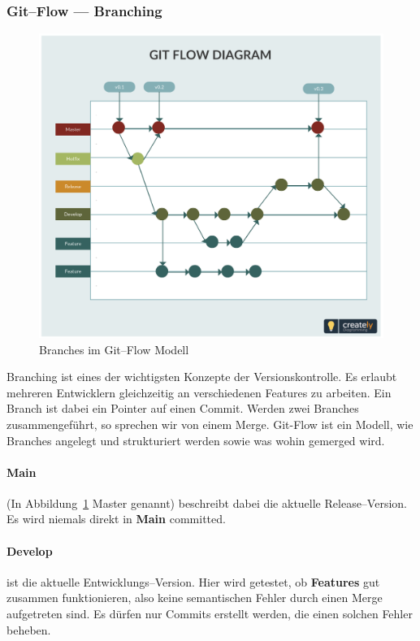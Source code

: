     \subsubsection{Git--Flow --- Branching}\label{subsubsec:git--flow-----branching}
        \begin{figure}
            \centering
            \includegraphics[width=\paperwidth-2in]{../assets/img/git_flow}
            \caption{Branches im Git--Flow Modell~\autocite{creately-no-date}}
            \label{fig:git-flow}
        \end{figure}
        Branching ist eines der wichtigsten Konzepte der Versionskontrolle.
        Es erlaubt mehreren Entwicklern gleichzeitig an verschiedenen Features zu arbeiten.
        Ein Branch ist dabei ein Pointer auf einen Commit.
        Werden zwei Branches zusammengeführt, so sprechen wir von einem Merge.
        Git-Flow ist ein Modell, wie Branches angelegt und strukturiert werden sowie was wohin gemerged wird.


        \paragraph{Main} (In Abbildung~\ref{fig:git-flow} Master genannt) beschreibt dabei die aktuelle Release--Version.
            Es wird niemals direkt in \textbf{Main} committed.


        \paragraph{Develop} ist die aktuelle Entwicklungs--Version.
            Hier wird getestet, ob \textbf{Features} gut zusammen funktionieren, also keine semantischen Fehler durch einen Merge aufgetreten sind.
            Es dürfen nur Commits erstellt werden, die einen solchen Fehler beheben.



